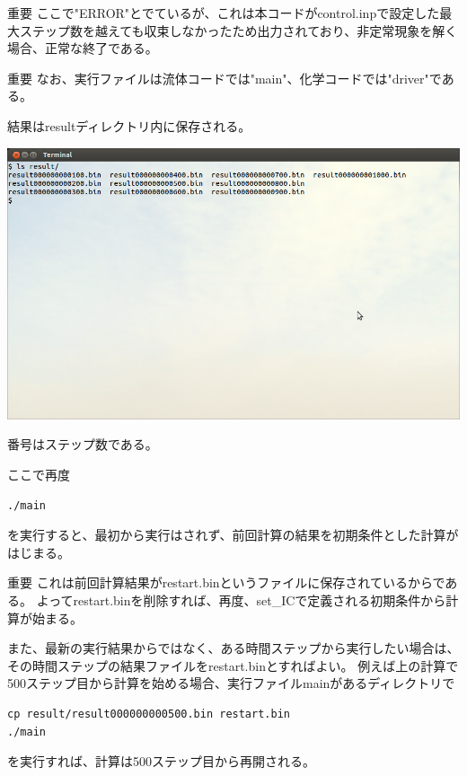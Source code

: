 \documentclass{jsarticle}
\begin{document}
\begin{itembox}[l]{重要}
ここで"ERROR"とでているが、これは本コードがcontrol.inpで設定した最大ステップ数を越えても収束しなかったため出力されており、非定常現象を解く場合、正常な終了である。
\end{itembox}
\begin{itembox}[l]{重要}
なお、実行ファイルは流体コードでは"main"、化学コードでは"driver"である。
\end{itembox}

結果はresultディレクトリ内に保存される。
\begin{center}
\includegraphics[width=.8\textwidth,bb=0 0 962 577]{tutorial_img/210.png}
\end{center}
番号はステップ数である。

\hspace{1em}

ここで再度
\begin{verbatim}
./main
\end{verbatim}
を実行すると、最初から実行はされず、前回計算の結果を初期条件とした計算がはじまる。
\begin{itembox}[l]{重要}
これは前回計算結果がrestart.binというファイルに保存されているからである。
よってrestart.binを削除すれば、再度、set\_ICで定義される初期条件から計算が始まる。
\end{itembox}
また、最新の実行結果からではなく、ある時間ステップから実行したい場合は、その時間ステップの結果ファイルをrestart.binとすればよい。
例えば上の計算で500ステップ目から計算を始める場合、実行ファイルmainがあるディレクトリで
\begin{verbatim}
cp result/result000000000500.bin restart.bin
./main
\end{verbatim}
を実行すれば、計算は500ステップ目から再開される。
\end{document}
